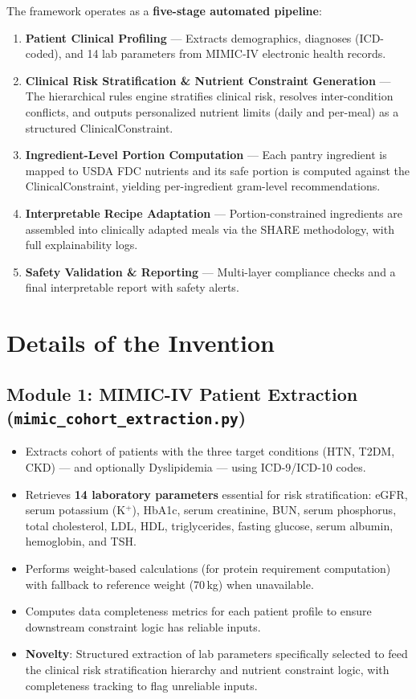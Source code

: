 \documentclass[a4paper,12pt]{article}
\begin{document}
The framework operates as a \textbf{five-stage automated pipeline}:
\begin{enumerate}[itemsep=0.3em]
    \item \textbf{Patient Clinical Profiling} --- Extracts demographics, diagnoses (ICD-coded), and 14 lab parameters from MIMIC-IV electronic health records.
    \item \textbf{Clinical Risk Stratification \& Nutrient Constraint Generation} --- The hierarchical rules engine stratifies clinical risk, resolves inter-condition conflicts, and outputs personalized nutrient limits (daily and per-meal) as a structured ClinicalConstraint.
    \item \textbf{Ingredient-Level Portion Computation} --- Each pantry ingredient is mapped to USDA FDC nutrients and its safe portion is computed against the ClinicalConstraint, yielding per-ingredient gram-level recommendations.
    \item \textbf{Interpretable Recipe Adaptation} --- Portion-constrained ingredients are assembled into clinically adapted meals via the SHARE methodology, with full explainability logs.
    \item \textbf{Safety Validation \& Reporting} --- Multi-layer compliance checks and a final interpretable report with safety alerts.
\end{enumerate}

\section*{Details of the Invention}

\subsection*{Module 1: MIMIC-IV Patient Extraction (\texttt{mimic\_cohort\_extraction.py})}
\begin{itemize}[itemsep=0.3em]
    \item Extracts cohort of patients with the three target conditions (HTN, T2DM, CKD) --- and optionally Dyslipidemia --- using ICD-9/ICD-10 codes.
    \item Retrieves \textbf{14 laboratory parameters} essential for risk stratification: eGFR, serum potassium (K$^+$), HbA1c, serum creatinine, BUN, serum phosphorus, total cholesterol, LDL, HDL, triglycerides, fasting glucose, serum albumin, hemoglobin, and TSH.
    \item Performs weight-based calculations (for protein requirement computation) with fallback to reference weight (70\,kg) when unavailable.
    \item Computes data completeness metrics for each patient profile to ensure downstream constraint logic has reliable inputs.
    \item \textbf{Novelty}: Structured extraction of lab parameters specifically selected to feed the clinical risk stratification hierarchy and nutrient constraint logic, with completeness tracking to flag unreliable inputs.
\end{itemize}
\end{document}
